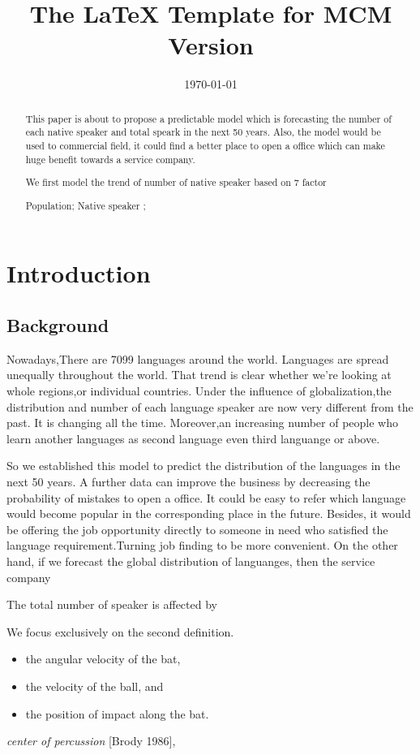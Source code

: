 \documentclass{mcmthesis}
\title{The \LaTeX{} Template for MCM Version \MCMversion}
\date{\today}
\begin{document}
\begin{abstract}
This paper is about to propose a predictable model which is forecasting the number of each native speaker and total speark in the next 50 years.
Also, the model would be used to commercial field, it could find a better place to open a office which can make huge benefit towards a service company.

We first model the trend of number of native speaker based on 7 factor 
\begin{keywords}
Population; Native speaker ; 
\end{keywords}
\end{abstract}
\maketitle
\tableofcontents
\section{Introduction}
\subsection{Background}
\qquad Nowadays,There are 7099 languages around the world. Languages are spread unequally throughout the world. 
That trend is clear whether we’re looking at whole regions,or individual countries.
Under the influence of globalization,the distribution and number of each language speaker are now very different from the past. 
It is changing all the time.
\cite{No-of-languages}
Moreover,an increasing number of people who learn another languages as second language even third languange or above. 

So we established this model to predict the distribution of the languages in the next 50 years. A further data can improve the business by decreasing
the probability of mistakes to open a office.
It could be easy to refer which language would become popular in the corresponding place in the future. Besides,
it would be offering the job opportunity directly to someone in need who satisfied the language requirement.Turning job finding to be more convenient.
On the other hand, if we forecast the global distribution of languanges, then the service company


The total number of speaker is affected by 


We focus exclusively on the second definition.

\lipsum[3]
\begin{itemize}
\item the angular velocity of the bat,
\item the velocity of the ball, and
\item the position of impact along the bat.
\end{itemize}
\lipsum[4]
\emph{center of percussion} [Brody 1986], \lipsum[5]
\end{document}
